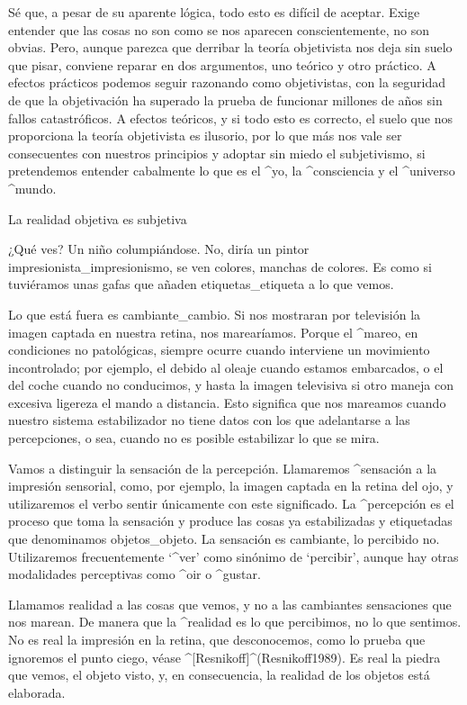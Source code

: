 Sé que, a pesar de su aparente lógica, todo esto es difícil de aceptar.
Exige entender que las cosas no son como se nos aparecen
conscientemente, no son obvias. Pero, aunque parezca que derribar la
teoría objetivista nos deja sin suelo que pisar, conviene reparar en dos
argumentos, uno teórico y otro práctico. A efectos prácticos podemos
seguir razonando como objetivistas, con la seguridad de que la
objetivación ha superado la prueba de funcionar millones de años sin
fallos catastróficos. A efectos teóricos, y si todo esto es correcto, el
suelo que nos proporciona la teoría objetivista es ilusorio, por lo que
más nos vale ser consecuentes con nuestros principios y adoptar sin
miedo el subjetivismo, si pretendemos entender cabalmente lo que es el
^{yo}, la ^{consciencia} y el ^{universo} ^{mundo}.


\Section La realidad objetiva es subjetiva

¿Qué ves? Un niño columpiándose. No, diría un pintor
impresionista_{impresionismo}, se ven colores, manchas de colores. Es
como si tuviéramos unas gafas que añaden etiquetas_{etiqueta} a lo que
vemos. %

Lo que está fuera es cambiante_{cambio}. Si nos mostraran por televisión
la imagen captada en nuestra retina, nos marearíamos. Porque el
^{mareo}, en condiciones no patológicas, siempre ocurre cuando
interviene un movimiento incontrolado; por ejemplo, el debido al oleaje
cuando estamos embarcados, o el del coche cuando no conducimos, y hasta
la imagen televisiva si otro maneja con excesiva ligereza el mando a
distancia. Esto significa que nos mareamos cuando nuestro sistema
estabilizador no tiene datos con los que adelantarse a las percepciones,
o sea, cuando no es posible estabilizar lo que se mira.

Vamos a distinguir la sensación de la percepción. Llamaremos
^{sensación} a la impresión sensorial, como, por ejemplo, la imagen
captada en la retina del ojo, y utilizaremos el verbo sentir únicamente
con este significado. La ^{percepción} es el proceso que toma la
sensación y produce las cosas ya estabilizadas y etiquetadas que
denominamos objetos_{objeto}. La sensación es cambiante, lo percibido
no. Utilizaremos frecuentemente `^{ver}' como sinónimo de `percibir',
aunque hay otras modalidades perceptivas como ^{oir} o ^{gustar}.

Llamamos realidad a las cosas que vemos, y no a las cambiantes
sensaciones que nos marean. De manera que la ^{realidad} es lo que
percibimos, no lo que sentimos. No es real la impresión en la retina,
que desconocemos, como lo prueba que ignoremos el punto ciego, véase
^[Resnikoff]^(Resnikoff1989). Es real la piedra que vemos, el objeto
visto, y, en consecuencia, la realidad de los objetos está elaborada.

